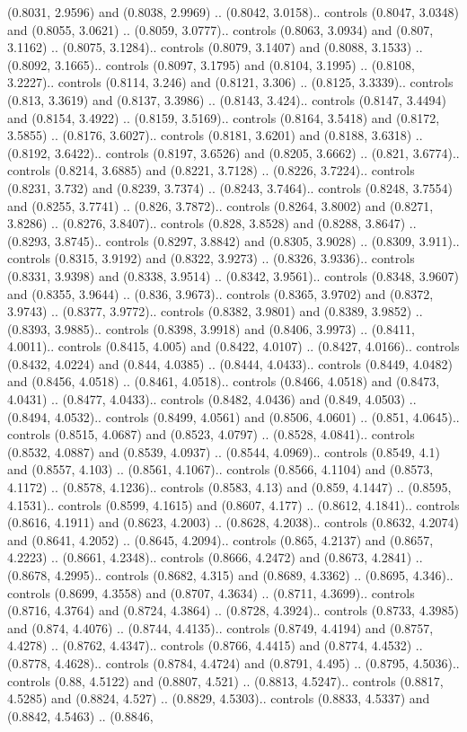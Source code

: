 (0.8031, 2.9596) and (0.8038, 2.9969) .. (0.8042, 3.0158).. controls (0.8047, 3.0348) and (0.8055, 3.0621) .. (0.8059, 3.0777).. controls (0.8063, 3.0934) and (0.807, 3.1162) .. (0.8075, 3.1284).. controls (0.8079, 3.1407) and (0.8088, 3.1533) .. (0.8092, 3.1665).. controls (0.8097, 3.1795) and (0.8104, 3.1995) .. (0.8108, 3.2227).. controls (0.8114, 3.246) and (0.8121, 3.306) .. (0.8125, 3.3339).. controls (0.813, 3.3619) and (0.8137, 3.3986) .. (0.8143, 3.424).. controls (0.8147, 3.4494) and (0.8154, 3.4922) .. (0.8159, 3.5169).. controls (0.8164, 3.5418) and (0.8172, 3.5855) .. (0.8176, 3.6027).. controls (0.8181, 3.6201) and (0.8188, 3.6318) .. (0.8192, 3.6422).. controls (0.8197, 3.6526) and (0.8205, 3.6662) .. (0.821, 3.6774).. controls (0.8214, 3.6885) and (0.8221, 3.7128) .. (0.8226, 3.7224).. controls (0.8231, 3.732) and (0.8239, 3.7374) .. (0.8243, 3.7464).. controls (0.8248, 3.7554) and (0.8255, 3.7741) .. (0.826, 3.7872).. controls (0.8264, 3.8002) and (0.8271, 3.8286) .. (0.8276, 3.8407).. controls (0.828, 3.8528) and (0.8288, 3.8647) .. (0.8293, 3.8745).. controls (0.8297, 3.8842) and (0.8305, 3.9028) .. (0.8309, 3.911).. controls (0.8315, 3.9192) and (0.8322, 3.9273) .. (0.8326, 3.9336).. controls (0.8331, 3.9398) and (0.8338, 3.9514) .. (0.8342, 3.9561).. controls (0.8348, 3.9607) and (0.8355, 3.9644) .. (0.836, 3.9673).. controls (0.8365, 3.9702) and (0.8372, 3.9743) .. (0.8377, 3.9772).. controls (0.8382, 3.9801) and (0.8389, 3.9852) .. (0.8393, 3.9885).. controls (0.8398, 3.9918) and (0.8406, 3.9973) .. (0.8411, 4.0011).. controls (0.8415, 4.005) and (0.8422, 4.0107) .. (0.8427, 4.0166).. controls (0.8432, 4.0224) and (0.844, 4.0385) .. (0.8444, 4.0433).. controls (0.8449, 4.0482) and (0.8456, 4.0518) .. (0.8461, 4.0518).. controls (0.8466, 4.0518) and (0.8473, 4.0431) .. (0.8477, 4.0433).. controls (0.8482, 4.0436) and (0.849, 4.0503) .. (0.8494, 4.0532).. controls (0.8499, 4.0561) and (0.8506, 4.0601) .. (0.851, 4.0645).. controls (0.8515, 4.0687) and (0.8523, 4.0797) .. (0.8528, 4.0841).. controls (0.8532, 4.0887) and (0.8539, 4.0937) .. (0.8544, 4.0969).. controls (0.8549, 4.1) and (0.8557, 4.103) .. (0.8561, 4.1067).. controls (0.8566, 4.1104) and (0.8573, 4.1172) .. (0.8578, 4.1236).. controls (0.8583, 4.13) and (0.859, 4.1447) .. (0.8595, 4.1531).. controls (0.8599, 4.1615) and (0.8607, 4.177) .. (0.8612, 4.1841).. controls (0.8616, 4.1911) and (0.8623, 4.2003) .. (0.8628, 4.2038).. controls (0.8632, 4.2074) and (0.8641, 4.2052) .. (0.8645, 4.2094).. controls (0.865, 4.2137) and (0.8657, 4.2223) .. (0.8661, 4.2348).. controls (0.8666, 4.2472) and (0.8673, 4.2841) .. (0.8678, 4.2995).. controls (0.8682, 4.315) and (0.8689, 4.3362) .. (0.8695, 4.346).. controls (0.8699, 4.3558) and (0.8707, 4.3634) .. (0.8711, 4.3699).. controls (0.8716, 4.3764) and (0.8724, 4.3864) .. (0.8728, 4.3924).. controls (0.8733, 4.3985) and (0.874, 4.4076) .. (0.8744, 4.4135).. controls (0.8749, 4.4194) and (0.8757, 4.4278) .. (0.8762, 4.4347).. controls (0.8766, 4.4415) and (0.8774, 4.4532) .. (0.8778, 4.4628).. controls (0.8784, 4.4724) and (0.8791, 4.495) .. (0.8795, 4.5036).. controls (0.88, 4.5122) and (0.8807, 4.521) .. (0.8813, 4.5247).. controls (0.8817, 4.5285) and (0.8824, 4.527) .. (0.8829, 4.5303).. controls (0.8833, 4.5337) and (0.8842, 4.5463) .. (0.8846, 